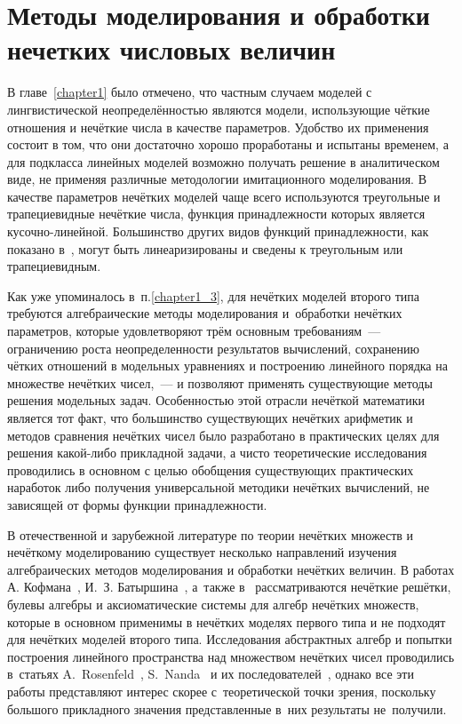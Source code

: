 \chapter{Методы моделирования и обработки нечетких числовых величин}
\label{chapter2}

В главе~\ref{chapter1} было отмечено, что частным случаем моделей с лингвистической неопределённостью являются модели, использующие чёткие отношения и нечёткие числа в качестве параметров. Удобство их применения состоит в том, что они достаточно хорошо проработаны и испытаны временем, а для подкласса линейных моделей возможно получать решение в аналитическом виде, не применяя различные методологии имитационного моделирования. В качестве параметров нечётких моделей чаще всего используются треугольные и трапециевидные нечёткие числа, функция принадлежности которых является кусочно-линейной. Большинство других видов функций принадлежности, как показано в~\cite{Hanss_Engineering}, могут быть линеаризированы и сведены к треугольным или трапециевидным.

Как уже упоминалось в~п.\ref{chapter1_3}, для нечётких моделей второго типа требуются алгебраические методы моделирования и~обработки нечётких параметров, которые удовлетворяют трём основным требованиям~--- ограничению роста неопределенности результатов вычислений, сохранению чётких отношений в модельных уравнениях и построению линейного порядка на множестве нечётких чисел,~--- и позволяют применять существующие методы решения модельных задач. Особенностью этой отрасли нечёткой математики является тот факт, что большинство существующих нечётких арифметик и методов сравнения нечётких чисел было разработано в практических целях для решения какой-либо прикладной задачи, а чисто теоретические исследования проводились в основном с целью обобщения существующих практических наработок либо получения универсальной методики нечётких вычислений, не зависящей от формы функции принадлежности. 

В отечественной и зарубежной литературе по теории нечётких множеств и нечёткому моделированию существует несколько направлений изучения алгебраических методов моделирования и обработки нечётких величин. В работах А. Кофмана~\cite{Kaufmann}, И.~З. Батыршина~\cite{Batyrshin, Hybrid_Systems}, а~также в~\cite{Fuzzy_Lattices, Axioms_Fuzzy_Algebra, Philosophy_Fuzzy_Structures} рассматриваются нечёткие решётки, булевы алгебры и аксиоматические системы для алгебр нечётких множеств, которые в основном применимы в нечётких моделях первого типа и не подходят для нечётких моделей второго типа. Исследования абстрактных алгебр и попытки построения линейного пространства над множеством нечётких чисел проводились в~статьях A.~Rosenfeld~\cite{Rosenfeld_Algebras}, S.~Nanda~\cite{Fuzzy_Fields} и их последователей~\cite{Fuzzy_Fields_Revised, Commutative_Algebra, Serbia_Algebras, Kosinski}, однако все эти работы представляют интерес скорее с~теоретической точки зрения, поскольку большого прикладного значения представленные в~них результаты не~получили.

